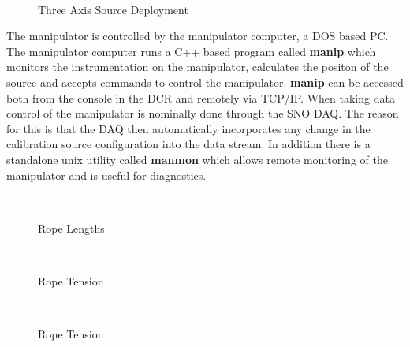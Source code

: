\begin{figure}[htb]
\begin{center}
\leavevmode
\epsfxsize=5in
~\\
\caption[Three Axis Source Deployment]
        {Three Axis Source Deployment
        }
\end{center}
\end{figure} 
  
  
  The manipulator is controlled by the manipulator computer, a DOS based
PC.  The manipulator computer runs a C++ based program called {\bf manip}
which monitors the instrumentation on the manipulator, calculates the positon
of the source and accepts commands to control the manipulator.  {\bf manip}
can be accessed both from the console in the DCR and remotely via TCP/IP.
When taking data control of the manipulator is nominally done through the
SNO DAQ.  The reason for this is that the DAQ then automatically incorporates
any change in the calibration source configuration into the data stream.
In addition there is a standalone unix utility called {\bf manmon} which
allows remote monitoring of the manipulator and is useful for diagnostics.
  
\begin{figure}[htb]
\begin{center}
\leavevmode
\epsfxsize=5in
~\\
\caption[Rope Lengths]
        {Rope Lengths
        }
\end{center}
\end{figure} 
  
\begin{figure}[htb]
\begin{center}
\leavevmode
\epsfxsize=5in
~\\
\caption[Rope Tension]
        {Rope Tension
        }
\end{center}
\end{figure} 
   
\begin{figure}[htb]
\begin{center}
\leavevmode
\epsfxsize=5in
~\\
\caption[Rope Tension]
        {Rope Tension
        }
\end{center}
\end{figure}
  
   

